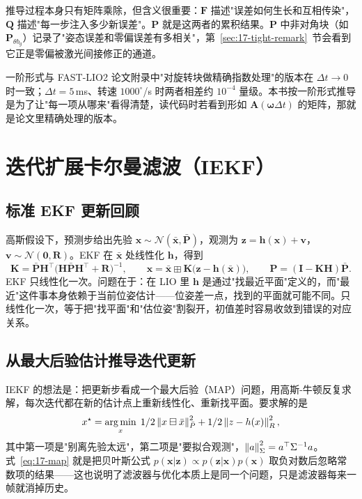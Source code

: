 推导过程本身只有矩阵乘除，但含义很重要：$\bm{F}$ 描述"误差如何生长和互相传染"，$\bm{Q}$ 描述"每一步注入多少新误差"。$\bm{P}$ 就是这两者的累积结果。$\bm{P}$ 中非对角块（如 $\bm{P}_{\theta b_g}$）记录了"姿态误差和零偏误差有多相关"，第~\ref{sec:17-tight-remark}~节会看到它正是零偏被激光间接修正的通道。

一阶形式与 FAST-LIO2 论文附录中"对旋转块做精确指数处理"的版本在 $\Delta t\to0$ 时一致；$\Delta t=5$\,ms、转速 $1000^{\circ}$/s 时两者相差约 $10^{-4}$ 量级。本书按一阶形式推导是为了让"每一项从哪来"看得清楚，读代码时若看到形如 $\bm{A}(\bm{\omega}\Delta t)$ 的矩阵，那就是论文里精确处理的版本。

\section{迭代扩展卡尔曼滤波（IEKF）}\label{sec:17-iekf}

\subsection{标准 EKF 更新回顾}

高斯假设下，预测步给出先验 $\bm{x}\sim\mathcal{N}(\bar{\bm{x}},\bar{\bm{P}})$，观测为 $\bm{z}=\bm{h}(\bm{x})+\bm{v}$，$\bm{v}\sim\mathcal{N}(\bm{0},\bm{R})$。EKF 在 $\bar{\bm{x}}$ 处线性化 $\bm{h}$，得到
\begin{equation}\label{eq:17-ekf}
  \bm{K}=\bar{\bm{P}}\bm{H}^{\top}\bigl(\bm{H}\bar{\bm{P}}\bm{H}^{\top}+\bm{R}\bigr)^{-1},\qquad
  \bm{x}=\bar{\bm{x}}\boxplus\bm{K}\bigl(\bm{z}-\bm{h}(\bar{\bm{x}})\bigr),\qquad
  \bm{P}=(\bm{I}-\bm{K}\bm{H})\bar{\bm{P}}.
\end{equation}
EKF 只线性化一次。问题在于：在 LIO 里 $\bm{h}$ 是通过"找最近平面"定义的，而"最近"这件事本身依赖于当前位姿估计——位姿差一点，找到的平面就可能不同。只线性化一次，等于把"找平面"和"估位姿"割裂开，初值差时容易收敛到错误的对应关系。

\subsection{从最大后验估计推导迭代更新}

IEKF 的想法是：把更新步看成一个最大后验（MAP）问题，用高斯-牛顿反复求解，每次迭代都在新的估计点上重新线性化、重新找平面。要求解的是
\begin{equation}\label{eq:17-map}
  x^{\star}=\operatorname*{arg\,min}_{x}\;1/2\left\lVert x\boxminus\bar{x} \right\rVert^{2}_{\bar{P}}
  +1/2\left\lVert z-h(x) \right\rVert^{2}_{R},
\end{equation}
其中第一项是"别离先验太远"，第二项是"要拟合观测"，$\left\lVert a \right\rVert^{2}_{\Sigma}=a^{\top}\Sigma^{-1}a$。式~\eqref{eq:17-map} 就是把贝叶斯公式 $p(\bm{x}|\bm{z})\propto p(\bm{z}|\bm{x})p(\bm{x})$ 取负对数后忽略常数项的结果——这也说明了滤波器与优化本质上是同一个问题，只是滤波器每来一帧就消掉历史。

